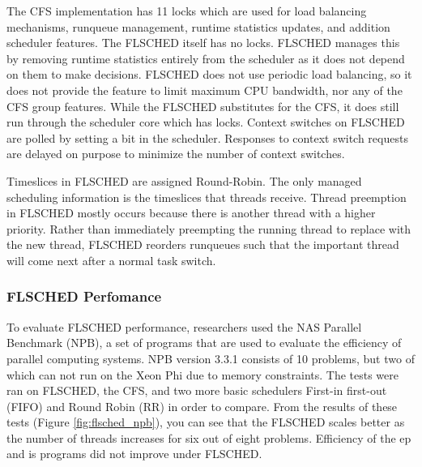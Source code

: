 \documentclass{sig-alternate}
\begin{document}
The CFS implementation has 11 locks which are used for load balancing mechanisms, runqueue management, runtime statistics updates, and addition scheduler features. The FLSCHED itself has no locks. FLSCHED manages this by removing runtime statistics entirely from the scheduler as it does not depend on them to make decisions. FLSCHED does not use periodic load balancing, so it does not provide the feature to limit maximum CPU bandwidth, nor any of the CFS group features. While the FLSCHED substitutes for the CFS, it does still run through the scheduler core which has locks. Context switches on FLSCHED are polled by setting a bit in the scheduler. Responses to context switch requests are delayed on purpose to minimize the number of context switches.~\cite{Jo:2017}

Timeslices in FLSCHED are assigned Round-Robin. The only managed scheduling information is the timeslices that threads receive. Thread preemption in FLSCHED mostly occurs because there is another thread with a higher priority. Rather than immediately preempting the running thread to replace with the new thread, FLSCHED reorders runqueues such that the important thread will come next after a normal task switch.~\cite{Jo:2017}


\subsubsection{FLSCHED Perfomance}
\label{sec:flsched_performance}

To evaluate FLSCHED performance, researchers used the NAS Parallel Benchmark (NPB), a set of programs that are used to evaluate the efficiency of parallel computing systems. NPB version 3.3.1 consists of 10 problems, but two of which can not run on the Xeon Phi due to memory constraints. The tests were ran on FLSCHED, the CFS, and two more basic schedulers First-in first-out (FIFO) and Round Robin (RR) in order to compare. From the results of these tests (Figure \ref{fig:flsched_npb}), you can see that the FLSCHED scales better as the number of threads increases for six out of eight problems. Efficiency of the ep and is programs did not improve under FLSCHED. \cite{Jo:2017}

\begin{figure*}
\centering
{}
\caption{FLSCHED performance comparison of various schedulers on programs in the NAS Parallel Benchmark. From Jo et al.~\cite{Jo:2017}}
\label{fig:flsched_npb}
\end{figure*}
\end{document}
